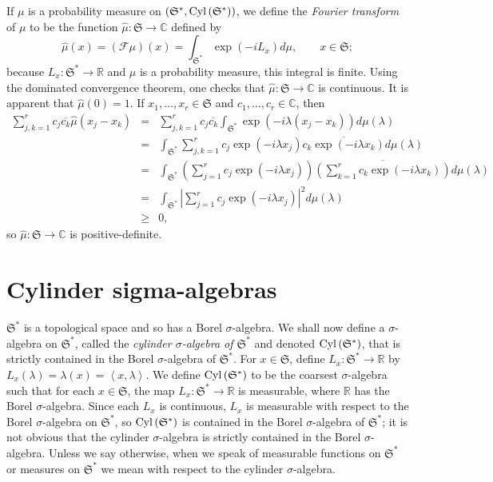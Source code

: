 \documentclass{article}
\newcommand{\inner}[2]{\left\langle #1, #2 \right\rangle}
\newcommand{\Cyl}{\ensuremath\mathrm{Cyl}\,}
\theoremstyle{definition}
\theoremstyle{definition}
\begin{document}
If $\mu$ is a probability measure on $(\mathfrak{S}^*,\Cyl(\mathfrak{S}^*))$, we define the {\em Fourier transform} of $\mu$ to be the function $\hat{\mu}:\mathfrak{S} \to \mathbb{C}$
defined by
\[
\hat{\mu}(x) =(\mathscr{F} \mu)(x)= \int_{\mathfrak{S}^*} \exp(-iL_x) d\mu, \qquad x \in \mathfrak{S};
\]
because $L_x:\mathfrak{S}^* \to \mathbb{R}$ and $\mu$ is a probability measure, this integral is finite. 
 Using the dominated convergence theorem, one checks that
  $\hat{\mu}:\mathfrak{S} \to \mathbb{C}$ is continuous. It is apparent that $\hat{\mu}(0)=1$. 
If $x_1,\ldots,x_r \in \mathfrak{S}$ and $c_1,\ldots,c_r \in \mathbb{C}$, then
\begin{eqnarray*}
\sum_{j,k=1}^r c_j\overline{c_k} \hat{\mu}(x_j-x_k)&=&\sum_{j,k=1}^r c_j \overline{c_k} \int_{\mathfrak{S}^*} \exp(-i\lambda(x_j-x_k)) d\mu(\lambda)\\
&=&\int_{\mathfrak{S}^*} \sum_{j,k=1}^r c_j \exp(-i\lambda x_j) \overline{c_k \exp(-i\lambda x_k)} d\mu(\lambda)\\
&=&\int_{\mathfrak{S}^*} \left( \sum_{j=1}^r c_j \exp(-i\lambda x_j) \right) \overline{\left(\sum_{k=1}^r c_k \exp(-i\lambda x_k) \right)} d\mu(\lambda)\\
&=&\int_{\mathfrak{S}^*} \left| \sum_{j=1}^r c_j \exp(-i\lambda x_j)\right|^2 d\mu(\lambda)\\
&\geq&0,
\end{eqnarray*}
so $\hat{\mu}:\mathfrak{S} \to \mathbb{C}$ is positive-definite. 



\section{Cylinder sigma-algebras}
$\mathfrak{S}^*$ is a topological space and so has a Borel $\sigma$-algebra.
We shall now define a $\sigma$-algebra on $\mathfrak{S}^*$, called the {\em cylinder $\sigma$-algebra of $\mathfrak{S}^*$} and denoted
$\Cyl(\mathfrak{S}^*)$, that is strictly contained in the Borel $\sigma$-algebra of $\mathfrak{S}^*$. 
For $x \in \mathfrak{S}$, define $L_x:\mathfrak{S}^* \to \mathbb{R}$ by $L_x(\lambda)=\lambda(x)=\inner{x}{\lambda}$. 
We define $\Cyl(\mathfrak{S}^*)$ to be the coarsest $\sigma$-algebra such that for each $x \in \mathfrak{S}$, the map $L_x:\mathfrak{S}^* \to \mathbb{R}$
is measurable, where $\mathbb{R}$ has the Borel $\sigma$-algebra. Since each $L_x$ is continuous, $L_x$  is measurable with respect to the Borel
$\sigma$-algebra on $\mathfrak{S}^*$, so
$\Cyl(\mathfrak{S}^*)$ is contained in the Borel $\sigma$-algebra of $\mathfrak{S}^*$; it is not obvious 
that the cylinder $\sigma$-algebra is strictly contained in the Borel $\sigma$-algebra.
Unless we say otherwise, when we speak of measurable functions on $\mathfrak{S}^*$ or measures on $\mathfrak{S}^*$ we mean with
respect to the cylinder $\sigma$-algebra.
\end{document}
